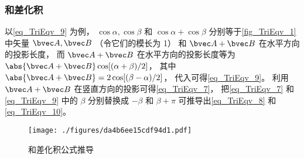 \subsubsection{和差化积}
以\autoref{eq_TriEqv_9} 为例， $\cos \alpha, \cos \beta$ 和 $\cos \alpha + \cos \beta$ 分别等于\autoref{fig_TriEqv_1} 中矢量 $\bvec A, \bvec B$ （令它们的模长为 1） 和 $\bvec A + \bvec B$ 在水平方向的投影长度， 而 $\bvec A + \bvec B$ 在水平方向的投影长度等为 $\abs{\bvec A + \bvec B}\cos[(\alpha+\beta)/2]$， 其中 $\abs{\bvec A + \bvec B} = 2\cos [(\beta-\alpha)/2]$， 代入可得\autoref{eq_TriEqv_9}。 利用 $\bvec A + \bvec B$ 在竖直方向的投影可得\autoref{eq_TriEqv_7}， 把\autoref{eq_TriEqv_7} 和\autoref{eq_TriEqv_9} 中的 $\beta$ 分别替换成 $-\beta$ 和 $\beta+\pi$ 可推导出\autoref{eq_TriEqv_8} 和\autoref{eq_TriEqv_10}。
\begin{figure}[ht]
\centering
\texttt{[image: ./figures/da4b6ee15cdf94d1.pdf]}
\caption{和差化积公式推导} \label{fig_TriEqv_1}
\end{figure}
